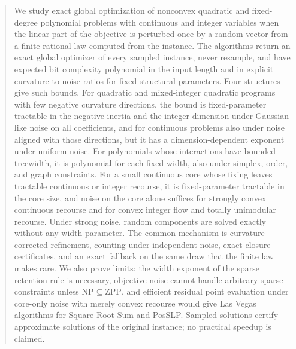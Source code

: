 \begin{abstract}
We study exact global optimization of nonconvex quadratic and fixed-degree
polynomial problems with continuous and integer variables when the linear
part of the objective is perturbed once by a random vector from a finite
rational law computed from the instance. The algorithms return an exact
global optimizer of every sampled instance, never resample, and have
expected bit complexity polynomial in the input length and in explicit
curvature-to-noise ratios for fixed structural parameters. Four structures
give such bounds. For quadratic and mixed-integer quadratic programs with few
negative curvature directions, the bound is fixed-parameter tractable in the
negative inertia and the integer dimension under Gaussian-like noise on all
coefficients, and for continuous problems also under noise aligned with
those directions, but it has a dimension-dependent exponent under uniform
noise. For polynomials whose interactions have bounded treewidth, it
is polynomial for each fixed width, also under simplex, order, and graph
constraints. For a small continuous core whose fixing leaves tractable
continuous or integer recourse, it is fixed-parameter tractable in the core
size, and noise on the core alone suffices for strongly convex continuous
recourse and for convex integer flow and totally unimodular recourse. Under
strong noise, random components are solved exactly without any width
parameter. The common mechanism is curvature-corrected refinement, counting
under independent noise, exact closure certificates, and an exact fallback
on the same draw that the finite law makes rare. We also prove limits: the
width exponent of the sparse retention rule is necessary, objective noise
cannot handle arbitrary sparse constraints unless
$\mathrm{NP}\subseteq\mathrm{ZPP}$, and efficient residual point evaluation
under core-only noise with merely convex recourse would give Las Vegas
algorithms for Square Root Sum and PosSLP. Sampled solutions certify approximate solutions of the
original instance; no practical speedup is claimed.
\end{abstract}
